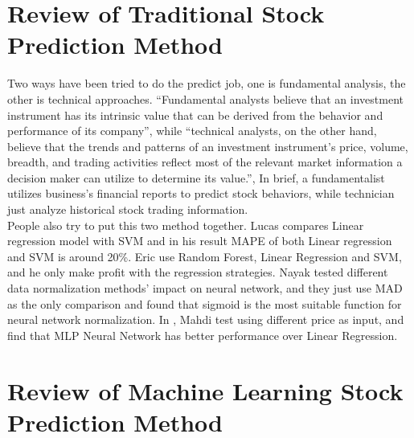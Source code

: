 \section{Review of Traditional Stock Prediction Method}

Two ways have been tried to do the predict job, one is fundamental analysis, the other is technical approaches\cite{1_edwardsmagee_1997}. “Fundamental analysts believe that an investment instrument has its intrinsic value that can be derived from the behavior and performance of its company”, while “technical analysts, on the other hand, believe that the trends and patterns of an investment instrument’s price, volume, breadth, and trading activities reflect most of the relevant market information a decision maker can utilize to determine its value.”\cite{lam2004neural}, In brief, a fundamentalist utilizes business’s financial reports to predict stock behaviors, while technician just analyze historical stock trading information.\\

People also try to put this two method together. Lucas\cite{nunnostock} compares Linear regression model with SVM and in his result MAPE of both Linear regression and SVM is around 20\%. Eric\cite{alexanderstock} use Random Forest, Linear Regression and SVM, and he only make profit with the regression strategies. Nayak\cite{nayak2014impact} tested different data normalization methods’ impact on neural network, and they just use MAD as the only comparison and found that sigmoid is the most suitable function for neural network normalization. In \cite{naeini2010stock}, Mahdi test using different price as input, and find that MLP Neural Network has better performance over Linear Regression.

\section{Review of Machine Learning Stock Prediction Method}